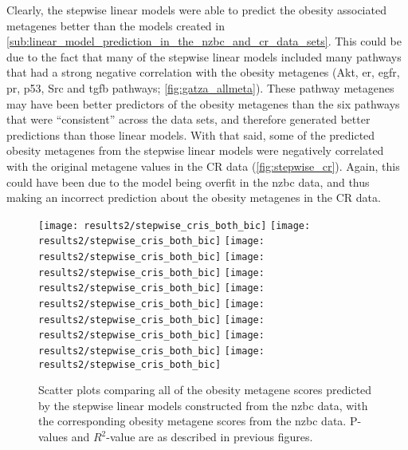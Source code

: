 Clearly, the stepwise linear models were able to predict the obesity associated metagenes better than the models created in \cref{sub:linear_model_prediction_in_the_nzbc_and_cr_data_sets}.
This could be due to the fact that many of the stepwise linear models included many pathways that had a strong negative correlation with the obesity metagenes (Akt, \gls{er}, \gls{egfr}, \gls{pr}, p53, Src and \gls{tgfb} pathways; \cref{fig:gatza_allmeta}).
These pathway metagenes may have been better predictors of the obesity metagenes than the six pathways that were ``consistent'' across the data sets, and therefore generated better predictions than those linear models.
With that said, some of the predicted obesity metagenes from the stepwise linear models were negatively correlated with the original metagene values in the CR data (\cref{fig:stepwise_cr}).
Again, this could have been due to the model being overfit in the \gls{nzbc} data, and thus making an incorrect prediction about the obesity metagenes in the CR data.

\begin{figure}[htpb]
	\centering
	\texttt{[image: results2/stepwise\_cris\_both\_bic]}
	\texttt{[image: results2/stepwise\_cris\_both\_bic]}
	\texttt{[image: results2/stepwise\_cris\_both\_bic]}
	\texttt{[image: results2/stepwise\_cris\_both\_bic]}
	\texttt{[image: results2/stepwise\_cris\_both\_bic]}
	\texttt{[image: results2/stepwise\_cris\_both\_bic]}
	\texttt{[image: results2/stepwise\_cris\_both\_bic]}
	\texttt{[image: results2/stepwise\_cris\_both\_bic]}
	\texttt{[image: results2/stepwise\_cris\_both\_bic]}
	\texttt{[image: results2/stepwise\_cris\_both\_bic]}
	\caption[Comparison of all the obesity metagene scores predicted from the stepwise linear models with the original obesity metagene scores from the \gls{nzbc} data]{Scatter plots comparing all of the obesity metagene scores predicted by the stepwise linear models constructed from the \gls{nzbc} data, with the corresponding obesity metagene scores from the \gls{nzbc} data.
	P-values and $R^2$-value are as described in previous figures.}
	\label{fig:stepwise_cris}
\end{figure}

